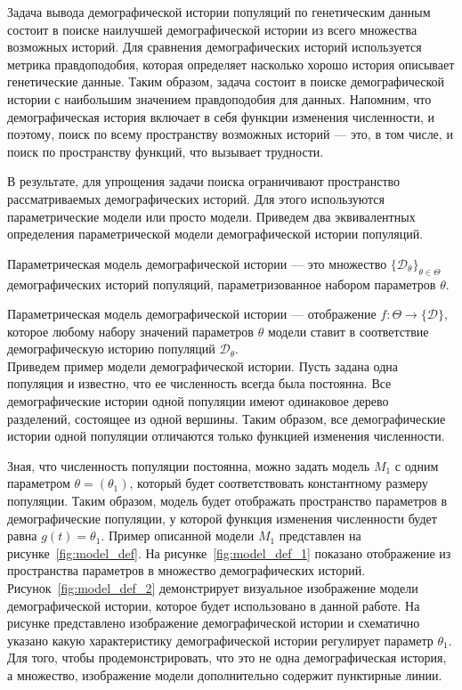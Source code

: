 \documentclass[a4paper,14pt,oneside,openany,article]{memoir}
\begin{document}
Задача вывода демографической истории популяций по генетическим данным состоит в поиске наилучшей демографической истории из всего множества возможных историй.
Для сравнения демографических историй используется метрика правдоподобия, которая определяет насколько хорошо история описывает генетические данные.
Таким образом, задача состоит в поиске демографической истории с наибольшим значением правдоподобия для данных.
Напомним, что демографическая история включает в себя функции изменения численности, и поэтому, поиск по всему пространству возможных историй --- это, в том числе, и поиск по пространству функций, что вызывает трудности.

В результате, для упрощения задачи поиска ограничивают пространство рассматриваемых демографических историй.
Для этого используются параметрические модели или просто модели.
Приведем два эквивалентных определения параметрической модели демографической истории популяций.

 Параметрическая модель демографической истории --- это множество $\{\mathcal{D}_\theta\}_{\theta \in \Theta}$ демографических историй популяций, параметризованное набором параметров $\theta$.

 Параметрическая модель демографической истории --- отображение $f: \Theta \to \{\mathcal{D}\}$, которое любому набору значений параметров $\theta$ модели ставит в соответствие демографическую историю популяций $\mathcal{D}_\theta$.\\

Приведем пример модели демографической истории.
Пусть задана одна популяция и известно, что ее численность всегда была постоянна.
Все демографические истории одной популяции имеют одинаковое дерево разделений, состоящее из одной вершины.
Таким образом, все демографические истории одной популяции отличаются только функцией изменения численности.

Зная, что численность популяции постоянна, можно задать модель $M_1$ с одним параметром $\theta = (\theta_1)$, который будет соответствовать константному размеру популяции.
Таким образом, модель будет отображать пространство параметров в демографические популяции, у которой функция изменения численности будет равна $g(t) = \theta_1$.
Пример описанной модели $M_1$ представлен на рисунке~\ref{fig:model_def}.
На рисунке~\ref{fig:model_def_1} показано отображение из пространства параметров в множество демографических историй.
Рисунок~\ref{fig:model_def_2} демонстрирует визуальное изображение модели демографической истории, которое будет использовано в данной работе.
На рисунке представлено изображение демографической истории и схематично указано какую характеристику демографической истории регулирует параметр $\theta_1$.
Для того, чтобы продемонстрировать, что это не одна демографическая история, а множество, изображение модели дополнительно содержит пунктирные линии.
\end{document}
